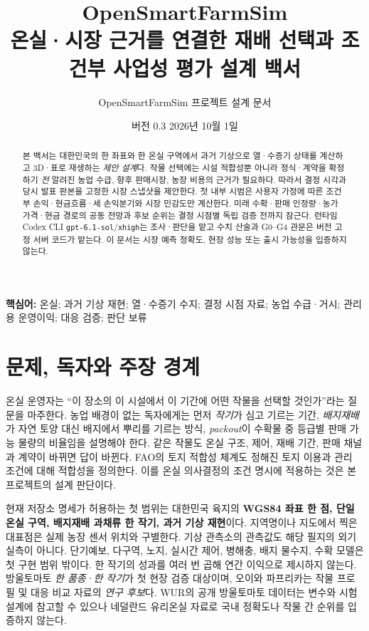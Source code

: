 \documentclass[11pt,a4paper]{article}
\title{\textbf{OpenSmartFarmSim}\\[0.35em]\large 온실·시장 근거를 연결한 재배 선택과 조건부 사업성 평가 설계 백서}
\author{OpenSmartFarmSim 프로젝트 설계 문서}
\date{버전 0.3 \quad 2026년 10월 1일\\[0.3em]\status}
\begin{document}
\maketitle
\begin{abstract}
본 백서는 대한민국의 한 좌표와 한 온실 구역에서 과거 기상으로 열·수증기 상태를 계산하고 3D·표로 재생하는 \emph{제안 설계}다. 작물 선택에는 시설 적합성뿐 아니라 정식·계약을 확정하기 \emph{전} 알려진 농업 수급, 향후 판매시장, 농장 비용의 근거가 필요하다. 따라서 결정 시각과 당시 발표 판본을 고정한 시장 스냅샷을 제안한다. 첫 내부 시범은 사용자 가정에 따른 조건부 손익·현금흐름·세 손익분기와 시장 민감도만 계산한다. 미래 수확·판매 인정량·농가 가격·현금 경로의 공동 전망과 후보 순위는 결정 시점별 독립 검증 전까지 잠근다. 런타임 Codex CLI \texttt{gpt-6.1-sol}/\texttt{xhigh}는 조사·판단을 맡고 수치 산술과 G0--G4 관문은 버전 고정 서버 코드가 맡는다. 이 문서는 시장 예측 정확도, 현장 성능 또는 출시 가능성을 입증하지 않는다.
\end{abstract}
\noindent\textbf{핵심어:} 온실; 과거 기상 재현; 열·수증기 수지; 결정 시점 자료; 농업 수급·거시; 관리용 운영이익; 대응 검증; 판단 보류

\tableofcontents
\clearpage

\section{문제, 독자와 주장 경계}
온실 운영자는 ``이 장소의 이 시설에서 이 기간에 어떤 작물을 선택할 것인가''라는 질문을 마주한다. 농업 배경이 없는 독자에게는 먼저 \emph{작기}가 심고 기르는 기간, \emph{배지재배}가 자연 토양 대신 배지에서 뿌리를 기르는 방식, \emph{packout}이 수확물 중 등급별 판매 가능 물량의 비율임을 설명해야 한다. 같은 작물도 온실 구조, 제어, 재배 기간, 판매 채널과 계약이 바뀌면 답이 바뀐다. FAO의 토지 적합성 체계도 정해진 토지 이용과 관리 조건에 대해 적합성을 정의한다. 이를 온실 의사결정의 조건 명시에 적용하는 것은 본 프로젝트의 설계 판단이다\cite{fao-land}.

현재 저장소 명세가 허용하는 첫 범위는 대한민국 육지의 \textbf{WGS84 좌표 한 점, 단일 온실 구역, 배지재배 과채류 한 작기, 과거 기상 재현}이다. 지역명이나 지도에서 찍은 대표점은 실제 농장 센서 위치와 구별한다. 기상 관측소의 관측값도 해당 필지의 외기 실측이 아니다. 단기예보, 다구역, 노지, 실시간 제어, 병해충, 배지 물수지, 수확 모델은 첫 구현 범위 밖이다. 한 작기의 성과를 여러 번 곱해 연간 이익으로 제시하지 않는다. 방울토마토 \emph{한 품종·한 작기}가 첫 현장 검증 대상이며, 오이와 파프리카는 작물 프로필 및 대응 비교 자료의 \emph{연구 후보}다. WUR의 공개 방울토마토 데이터는 변수와 시험 설계에 참고할 수 있으나 네덜란드 유리온실 자료로 국내 정확도나 작물 간 순위를 입증하지 않는다\cite{wur-data}.
\end{document}
